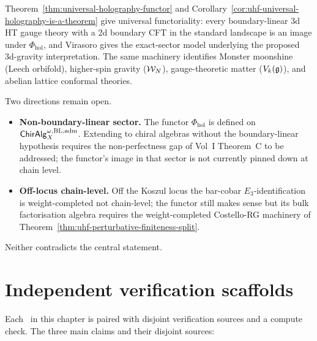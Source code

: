\begin{remark}
\label{rem:uhf-gravity-functorial-form}
Theorem~\ref{thm:universal-holography-functor} and
Corollary~\ref{cor:uhf-universal-holography-is-a-theorem} give
universal functoriality: every boundary-linear 3d HT gauge theory
with a 2d boundary CFT in the standard landscape is an image under
$\Phi_{\mathrm{hol}}$, and Virasoro gives the exact-sector model
underlying the proposed 3d-gravity interpretation.
The same machinery identifies
Monster moonshine (Leech orbifold), higher-spin gravity
($\mathcal{W}_N$), gauge-theoretic matter ($V_k(\mathfrak{g})$), and abelian
lattice conformal theories.
\end{remark}

\begin{remark}
\label{rem:uhf-open}
Two directions remain open.
\begin{itemize}[leftmargin=1.3em]
\item \textbf{Non-boundary-linear sector.} The functor
 $\Phi_{\mathrm{hol}}$ is defined on
 $\mathsf{ChirAlg}^{\omega,\mathrm{BL,adm}}_X$.
 Extending to chiral algebras without the boundary-linear
 hypothesis requires the non-perfectness gap of Vol~I
 Theorem~C to be addressed; the functor's image in that sector
 is not currently pinned down at chain level.
\item \textbf{Off-locus chain-level.} Off the Koszul locus the
 bar-cobar $E_3$-identification is weight-completed not
 chain-level; the functor still makes sense but its bulk
 factorisation algebra requires the weight-completed Costello-RG
 machinery of Theorem~\ref{thm:uhf-perturbative-finiteness-split}.
\end{itemize}
Neither contradicts the central statement.
\end{remark}

\section{Independent verification scaffolds}
\label{sec:uhf-independent-verification}

Each \ClaimStatusProvedHere\ in this chapter is paired with disjoint
verification sources and a compute check. The three main claims and
their disjoint sources:

